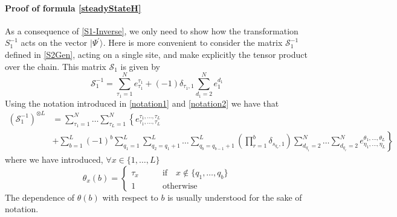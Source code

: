 \documentclass[10pt]{article}
\numberwithin{equation}{section}
\numberwithin{equation}{subsection}
\begin{document}
	\paragraph{Proof of formula \eqref{steadyStateH}} As a consequence of \eqref{S1-Inverse}, we only need to show how the transformation $S_{1}^{-1}$ acts on the vector $|\Psi^{'}\rangle$. Here is more convenient to consider the matrix $\mathcal{S}_{1}^{-1}$ defined in \eqref{S2Gen}, acting on a single site, and make explicitly the tensor product over the chain. This matrix $\mathcal{S}_{1}$ is given by
	\begin{equation}\label{S1-L1}
		\mathcal{S}_{1}^{-1}=\sum_{\tau_{1}=1}^{N}e_{\tau_{1}}^{\tau_{1}}+(-1)\delta_{\tau_{1},1}\sum_{d_{1}=2}^{N}e_{1}^{d_{1}}
	\end{equation}
	Using the notation introduced in \eqref{notation1} and \eqref{notation2} we have that 
	\begin{equation}
		\begin{split}
			\left(\mathcal{S}_{1}^{-1}\right)^{\otimes L}&=\sum_{\tau_{1}=1}^{N}\ldots\sum_{\tau_{L}=1}^{N}\left\{e_{\tau_{1},\ldots,\tau_{L}}^{\tau_{1},\ldots,\tau_{L}}\right.
			\\&
			+\left.\sum_{b=1}^{L}(-1)^{b}\sum_{q_{1}=1}^{L}\sum_{q_{2}=q_{1}+1}^{L}\ldots\sum_{q_{b}=q_{b-1}+1}^{L}\left(\prod_{r=1}^{b}\delta_{s_{q_{r}},1}\right)\sum_{d_{q_{1}}=2}^{N}\ldots\sum_{d_{q_{r}}=2}^{N}e_{\eta_{1},\ldots,\eta_{L}}^{\theta_{1},\ldots,\theta_{L}}\right\} 
		\end{split}
	\end{equation}
	where we have introduced, $\forall x\in \{1,\ldots,L\}$
	\begin{equation}
			\theta_{x}(b)=\begin{cases}
				\tau_{x}\qquad &\text{if}\quad x\notin \{q_{1},\ldots,q_{b}\}\\
				1 \qquad &\text{otherwise}
			\end{cases}
		\end{equation}
		The dependence of $\theta(b)$ with respect to $b$ is usually understood for the sake of notation. 
\end{document}
